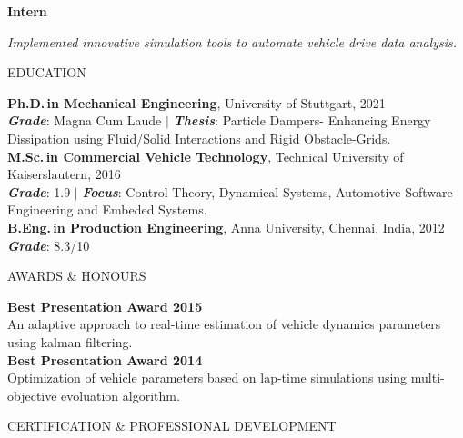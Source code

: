 \documentclass[a4paper,10pt]{article}
\begin{document}
\noindent
\colorbox{gray!40}{%
    \parbox{0.99\textwidth}{%
        \textcolor{highlightcolor}{\textbf{Intern}}
    }%
}

\vspace{0.2cm}
\noindent
\textit{Implemented innovative simulation tools to automate vehicle drive data analysis.}

\newpage

\noindent{\rule{\linewidth}{1.4pt}}
\noindent EDUCATION 

\vspace{-0.1cm}
\noindent{\rule{\linewidth}{0.01cm}}

\noindent \textbf{Ph.D.\,in Mechanical Engineering}, University of Stuttgart, 2021\\
\noindent \textcolor{highlightcolor}{\textbf{\textit{Grade}}}: Magna Cum Laude $\vert$ \textcolor{highlightcolor}{\textbf{\textit{Thesis}}}: {Particle Dampers- Enhancing Energy Dissipation using Fluid/Solid Interactions and Rigid Obstacle-Grids.}\\

\noindent \textbf{M.Sc.\,in Commercial Vehicle Technology}, Technical University of Kaiserslautern, 2016\\
\noindent \textcolor{highlightcolor}{\textbf{\textit{Grade}}}: 1.9 $\vert$ \textcolor{highlightcolor}{\textbf{\textit{Focus}}}: Control Theory, Dynamical Systems, Automotive Software Engineering and Embeded Systems.\\

\noindent \textbf{B.Eng.\,in Production Engineering}, Anna University, Chennai, India, 2012\\
\noindent \textcolor{highlightcolor}{\textbf{\textit{Grade}}}: 8.3/10

\noindent{\rule{\linewidth}{1.4pt}}
AWARDS \& HONOURS

\vspace{-0.1cm}
\noindent{\rule{\linewidth}{0.01cm}}

\vspace{0.1cm}
\noindent \textbf{Best Presentation Award 2015}\\
An adaptive approach to real-time estimation of vehicle dynamics parameters using kalman filtering.\\

\noindent \textbf{Best Presentation Award 2014}\\
Optimization of vehicle parameters based on lap-time simulations using multi-objective evoluation algorithm.

\noindent{\rule{\linewidth}{1.4pt}}
CERTIFICATION \& PROFESSIONAL DEVELOPMENT
\end{document}

